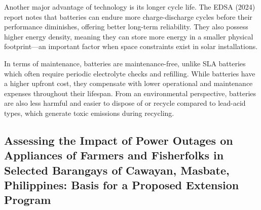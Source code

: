 {Another major advantage of  technology is its longer cycle life. The EDSA (2024) report notes that  batteries can endure more charge-discharge cycles before their performance diminishes, offering better long-term reliability. They also possess higher energy density, meaning they can store more energy in a smaller physical footprint—an important factor when space constraints exist in solar installations.

In terms of maintenance,  batteries are maintenance-free, unlike SLA batteries which often require periodic electrolyte checks and refilling. While  batteries have a higher upfront cost, they compensate with lower operational and maintenance expenses throughout their lifespan. From an environmental perspective,  batteries are also less harmful and easier to dispose of or recycle compared to lead-acid types, which generate toxic emissions during recycling.

\subsection{Assessing the Impact of Power Outages on Appliances of Farmers and Fisherfolks in Selected Barangays of Cawayan, Masbate, Philippines: Basis for a Proposed Extension Program}

}
